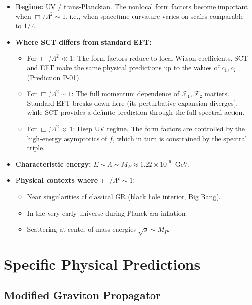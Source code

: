 \documentclass[11pt,a4paper]{article}
\begin{document}
\begin{itemize}[leftmargin=2em]
  \item \textbf{Regime:} UV / trans-Planckian. The nonlocal form factors become important when $\Box/\Lambda^2 \sim 1$, i.e., when spacetime curvature varies on scales comparable to $1/\Lambda$.

  \item \textbf{Where SCT differs from standard EFT:}
    \begin{itemize}
      \item For $\Box/\Lambda^2 \ll 1$: The form factors reduce to local Wilson coefficients. SCT and EFT make the same physical predictions up to the values of $c_1, c_2$ (Prediction P-01).
      \item For $\Box/\Lambda^2 \sim 1$: The full momentum dependence of $\mathcal{F}_1, \mathcal{F}_2$ matters. Standard EFT breaks down here (its perturbative expansion diverges), while SCT provides a definite prediction through the full spectral action.
      \item For $\Box/\Lambda^2 \gg 1$: Deep UV regime. The form factors are controlled by the high-energy asymptotics of $f$, which in turn is constrained by the spectral triple.
    \end{itemize}

  \item \textbf{Characteristic energy:} $E \sim \Lambda \sim M_P \approx 1.22 \times 10^{19}$~GeV.

  \item \textbf{Physical contexts where $\Box/\Lambda^2 \sim 1$:}
    \begin{itemize}
      \item Near singularities of classical GR (black hole interior, Big Bang).
      \item In the very early universe during Planck-era inflation.
      \item Scattering at center-of-mass energies $\sqrt{s} \sim M_P$.
    \end{itemize}
\end{itemize}

\section{Specific Physical Predictions}

\subsection{Modified Graviton Propagator}
\end{document}
